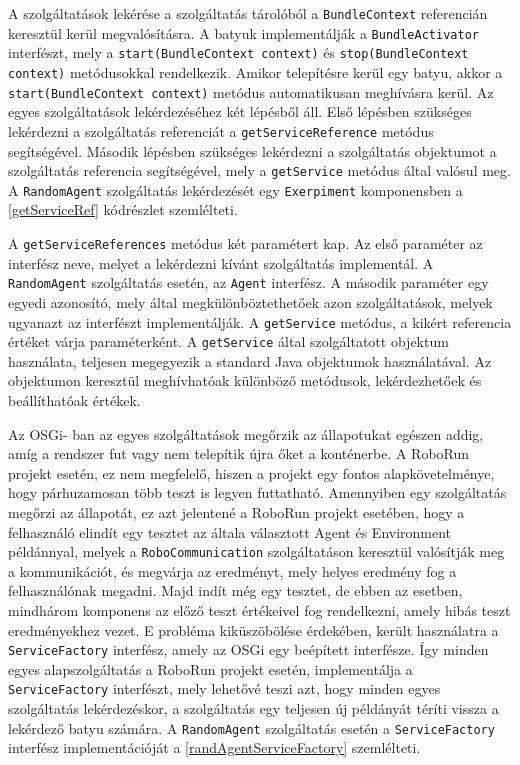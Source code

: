 A szolgáltatások lekérése a szolgáltatás tárolóból a \texttt{BundleContext} referencián keresztül kerül megvalósításra. A batyuk implementálják a \texttt{BundleActivator} interfészt, mely a \texttt{start(BundleContext context)} és \texttt{stop(BundleContext context)} metódusokkal rendelkezik. Amikor telepítésre kerül egy batyu, akkor a \texttt{start(BundleContext context)} metódus automatikusan meghívásra kerül. Az egyes szolgáltatások lekérdezéséhez két lépésből áll. Első lépésben szükséges lekérdezni a szolgáltatás referenciát a \texttt{getServiceReference} metódus segítségével. Második lépésben szükséges lekérdezni a szolgáltatás objektumot a szolgáltatás referencia segítségével, mely a \texttt{getService} metódus által valósul meg. A \texttt{RandomAgent} szolgáltatás lekérdezését egy \texttt{Exerpiment} komponensben a \ref{getServiceRef} kódrészlet szemlélteti. 

%


A \texttt{getServiceReferences} metódus két paramétert kap. Az első paraméter az interfész neve, melyet a lekérdezni kívánt szolgáltatás implementál. A \texttt{RandomAgent} szolgáltatás esetén, az \texttt{Agent} interfész. A második paraméter egy egyedi azonosító, mely által megkülönböztethetőek azon szolgáltatások, melyek ugyanazt az interfészt implementálják. 
A \texttt{getService} metódus, a kikért referencia értéket várja paraméterként. A \texttt{getService} által szolgáltatott objektum használata, teljesen megegyezik a standard Java objektumok használatával. Az objektumon keresztül meghívhatóak különböző metódusok, lekérdezhetőek és beállíthatóak értékek. 

Az OSGi- ban az egyes szolgáltatások megőrzik az állapotukat egészen addig, amíg a rendszer fut vagy nem telepítik újra őket a konténerbe. A RoboRun projekt esetén, ez nem megfelelő, hiszen a projekt egy fontos alapkövetelménye, hogy párhuzamosan több teszt is legyen futtatható. Amennyiben egy szolgáltatás megőrzi az állapotát, ez azt jelentené a RoboRun projekt esetében, hogy a felhasználó elindít egy tesztet az általa választott Agent és Environment példánnyal, melyek a \texttt{RoboCommunication} szolgáltatáson keresztül valósítják meg a kommunikációt, és megvárja az eredményt, mely helyes eredmény fog a felhasználónak megadni. Majd indít még egy tesztet, de ebben az esetben, mindhárom komponens az előző teszt értékeivel fog rendelkezni, amely hibás teszt eredményekhez vezet. E probléma kiküszöbölése érdekében, került használatra a  \texttt{ServiceFactory} interfész, amely az OSGi egy beépített interfésze. Így minden egyes alapszolgáltatás a RoboRun projekt esetén, implementálja a  \texttt{ServiceFactory} interfészt, mely lehetővé teszi azt, hogy minden egyes szolgáltatás lekérdezéskor, a szolgáltatás egy teljesen új példányát téríti vissza a lekérdező batyu számára. A \texttt{RandomAgent} szolgáltatás esetén a \texttt{ServiceFactory} interfész implementációját a \ref{randAgentServiceFactory} szemlélteti.

